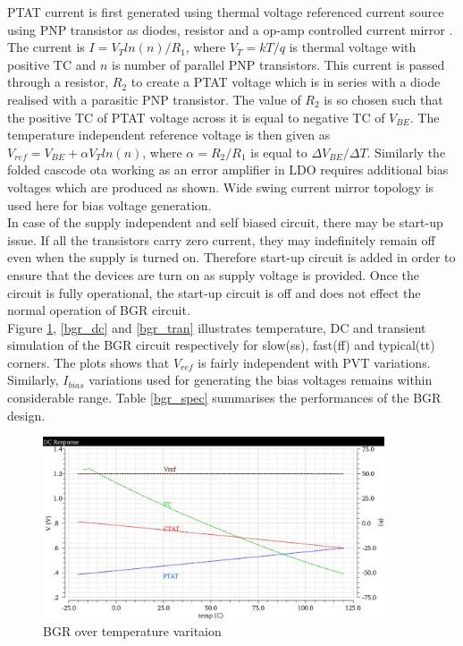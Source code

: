 \documentclass[12pt,a4paper,UKenglish]{article}
\begin{document}
PTAT current is first generated using thermal voltage referenced current source using PNP transistor as diodes, resistor and a op-amp controlled current mirror \cite[pp. 391-392]{razavi_2001}. The current is $I = V_T ln(n)/R_1$, where $V_T = kT/q $ is thermal voltage with positive TC and $n$ is number of parallel PNP transistors. This current is passed through a resistor, $R_2$ to create a PTAT voltage which is in series with a diode realised with a parasitic PNP transistor. The value of $R_2$ is so chosen such that the positive TC of PTAT voltage across it is equal to negative TC of $V_{BE}$. The temperature independent reference voltage is then given as $V_{ref}  = V_{BE} + \alpha V_T ln(n)$, where $ \alpha = R_2/R_1$ is equal to $  \Delta V_{BE}/\Delta T$. Similarly the folded cascode  \gls{ota} working as an error amplifier in LDO requires additional bias voltages which are produced as shown. Wide swing current mirror topology is used here for bias voltage generation.\\

In case of the supply independent and self biased circuit, there may be start-up issue. If all the transistors carry zero current, they may indefinitely remain off even when the supply is turned on. Therefore start-up circuit is added in order to ensure that the devices are turn on as supply voltage is provided. Once the circuit is fully operational, the start-up circuit is off and does not effect the normal operation of BGR circuit. \\

Figure  \ref{bgr_temp}, \ref{bgr_dc} and \ref{bgr_tran} illustrates temperature, DC and transient simulation of the BGR circuit respectively for slow(ss), fast(ff) and typical(tt) corners. The plots shows that $V_{ref}$ is fairly independent with PVT variations. Similarly, $I_{bias}$ variations used for generating the bias voltages remains within considerable range. Table \ref{bgr_spec} summarises the performances of the BGR design. 

\begin{figure}[htbp] %
   \centering
   \includegraphics[width=0.9\textwidth]{img/bgr_temp.pdf} 
   \caption{BGR over temperature varitaion}
   \label{bgr_temp}
\end{figure}
\end{document}
